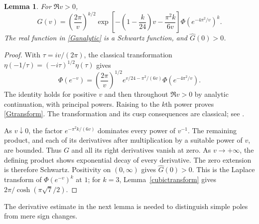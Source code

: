 \documentclass[11pt]{amsart}
\newtheorem{lemma}[theorem]{Lemma}
\theoremstyle{definition}
\theoremstyle{remark}
\numberwithin{equation}{section}
\begin{document}
\begin{lemma}\label{Gschwartz}
For $\Re v>0$,
\begin{equation}\label{Gtransform}
 G(v)=\left(\frac{2\pi}{v}\right)^{k/2}
 \exp\!\left[-\left(1-\frac{k}{24}\right)v-\frac{\pi^2k}{6v}\right]
 \Phi(e^{-4\pi^2/v})^k.
\end{equation}
The real function in \eqref{Ganalytic} is a Schwartz function, and $\widehat G(0)>0$.
\end{lemma}
\begin{proof}
With $\tau=iv/(2\pi)$, the classical transformation
$\eta(-1/\tau)=(-i\tau)^{1/2}\eta(\tau)$ gives
\[
 \Phi(e^{-v})=\left(\frac{2\pi}{v}\right)^{1/2}
 e^{v/24-\pi^2/(6v)}\Phi(e^{-4\pi^2/v}).
\]
The identity holds for positive $v$ and then throughout $\Re v>0$ by analytic continuation, with principal powers. Raising to the $k$th power proves \eqref{Gtransform}. The transformation and its cusp consequences are classical; see \cite{Apostol,Rademacher}.

As $v\downarrow0$, the factor $e^{-\pi^2k/(6v)}$ dominates every power of $v^{-1}$. The remaining product, and each of its derivatives after multiplication by a suitable power of $v$, are bounded. Thus $G$ and all its right derivatives vanish at zero. As $v\to+\infty$, the defining product shows exponential decay of every derivative. The zero extension is therefore Schwartz. Positivity on $(0,\infty)$ gives $\widehat G(0)>0$. This is the Laplace transform of $\Phi(e^{-v})^k$ at $1$; for $k=3$, Lemma~\ref{cubictransform} gives $2\pi/\cosh(\pi\sqrt7/2)$.
\end{proof}

The derivative estimate in the next lemma is needed to distinguish simple poles from mere sign changes.
\end{document}
